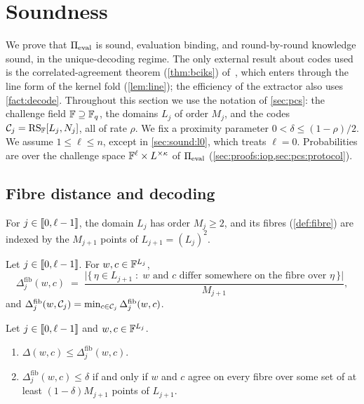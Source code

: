 \section{Soundness}\label{sec:sound}

We prove that $\Pi_{\mathrm{eval}}$ is sound, evaluation binding, and round-by-round knowledge sound, in the unique-decoding regime.
The only external result about codes used is the correlated-agreement theorem (\cref{thm:bciks}) of~\cite{BCIKS23}, which enters through the line form of the kernel fold (\cref{lem:line}); the efficiency of the extractor also uses \cref{fact:decode}.
Throughout this section we use the notation of \cref{sec:pcs}: the challenge field $\mathbb{F} \supseteq \mathbb{F}_q$, the domains $L_j$ of order $M_j$, and the codes $\mathcal{C}_j = \mathrm{RS}_{\mathbb{F}}[L_j, N_j]$, all of rate $\rho$.
We fix a proximity parameter $0 < \delta \le (1-\rho)/2$.
We assume $1 \le \ell \le n$, except in \cref{sec:sound:l0}, which treats $\ell = 0$.
Probabilities are over the challenge space $\mathbb{F}^\ell \times L^{\times\kappa}$ of $\Pi_{\mathrm{eval}}$ (\cref{sec:proofs:iop,sec:pcs:protocol}).

\subsection{Fibre distance and decoding}\label{sec:sound:fibre}

For $j \in \llbracket 0, \ell-1 \rrbracket$, the domain $L_j$ has order $M_j \ge 2$, and its fibres (\cref{def:fibre}) are indexed by the $M_{j+1}$ points of $L_{j+1} = (L_j)^2$.

\begin{definition}\label{def:fibre-dist}
Let $j \in \llbracket 0, \ell-1 \rrbracket$. For $w, c \in \mathbb{F}^{L_j}$,
\[
  \Delta^{\mathrm{fib}}_j(w,c) \;=\; \frac{\bigl|\{\, \eta \in L_{j+1} \;:\; w \text{ and } c \text{ differ somewhere on the fibre over } \eta \,\}\bigr|}{M_{j+1}},
\]
and $\Delta^{\mathrm{fib}}_j(w, \mathcal{C}_j) = \min_{c \in \mathcal{C}_j} \Delta^{\mathrm{fib}}_j(w,c)$.
\end{definition}

\begin{lemma}\label{lem:fibre-dist}
Let $j \in \llbracket 0, \ell-1 \rrbracket$ and $w, c \in \mathbb{F}^{L_j}$.
\begin{enumerate}
  \item $\Delta(w,c) \le \Delta^{\mathrm{fib}}_j(w,c)$.
  \item $\Delta^{\mathrm{fib}}_j(w,c) \le \delta$ if and only if $w$ and $c$ agree on every fibre over some set of at least $(1-\delta)M_{j+1}$ points of $L_{j+1}$.
\end{enumerate}
\end{lemma}

